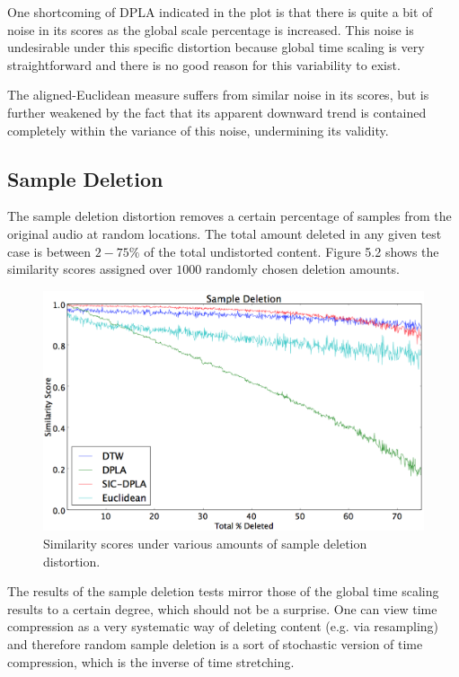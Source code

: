 \documentclass[a4paper,12pt]{report} 	%
\numberwithin{figure}{chapter}
\numberwithin{table}{chapter}
\numberwithin{equation}{chapter}
\begin{document}
\begin{flushleft}
One shortcoming of DPLA indicated in the plot is that there is quite a bit of noise in its scores as the global scale percentage is increased. This noise is undesirable under this specific distortion because global time scaling is very straightforward and there is no good reason for this variability to exist.

The aligned-Euclidean measure suffers from similar noise in its scores, but is further weakened by the fact that its apparent downward trend is contained completely within the variance of this noise, undermining its validity.

\subsection{Sample Deletion}
The sample deletion distortion removes a certain percentage of samples from the original audio at random locations. The total amount deleted in any given test case is between $2-75\%$ of the total undistorted content. Figure 5.2 shows the similarity scores assigned over $1000$ randomly chosen deletion amounts.
\begin{figure}[h!]
\begin{center}
\includegraphics[scale=0.5,width=\linewidth]{SampleDeletion}
\caption[Sample Deletion Results]{Similarity scores under various amounts of sample deletion distortion.}
\end{center}
\end{figure}
The results of the sample deletion tests mirror those of the global time scaling results to a certain degree, which should not be a surprise. One can view time compression as a very systematic way of deleting content (e.g. via resampling) and therefore random sample deletion is a sort of stochastic version of time compression, which is the inverse of time stretching. 


\end{flushleft}
\end{document}
